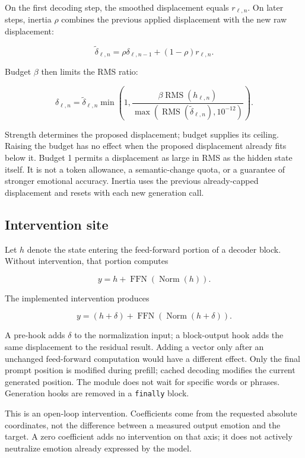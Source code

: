 \documentclass[manuscript,screen,nonacm]{acmart}
\begin{document}
On the first decoding step, the smoothed displacement equals
\(r_{\ell,n}\). On later steps, inertia \(\rho\) combines the previous
applied displacement with the new raw displacement:

\[
\widetilde\delta_{\ell,n}=\rho\delta_{\ell,n-1}+(1-\rho)r_{\ell,n}.
\]

Budget \(\beta\) then limits the RMS ratio:

\[
\delta_{\ell,n}=\widetilde\delta_{\ell,n}
\min\left(1,
\frac{\beta\operatorname{RMS}(h_{\ell,n})}
{\max(\operatorname{RMS}(\widetilde\delta_{\ell,n}),10^{-12})}
\right).
\]

Strength determines the proposed displacement; budget supplies its
ceiling. Raising the budget has no effect when the proposed displacement
already fits below it. Budget 1 permits a displacement as large in RMS
as the hidden state itself. It is not a token allowance, a
semantic-change quota, or a guarantee of stronger emotional accuracy.
Inertia uses the previous already-capped displacement and resets with
each new generation call.

\subsection{Intervention site}\label{intervention-site}

Let \(h\) denote the state entering the feed-forward portion of a
decoder block. Without intervention, that portion computes

\[
y=h+\operatorname{FFN}(\operatorname{Norm}(h)).
\]

The implemented intervention produces

\[
y=(h+\delta)+\operatorname{FFN}(\operatorname{Norm}(h+\delta)).
\]

A pre-hook adds \(\delta\) to the normalization input; a block-output
hook adds the same displacement to the residual result. Adding a vector
only after an unchanged feed-forward computation would have a different
effect. Only the final prompt position is modified during prefill;
cached decoding modifies the current generated position. The module does
not wait for specific words or phrases. Generation hooks are removed in
a \nolinkurl{finally} block.

This is an open-loop intervention. Coefficients come from the requested
absolute coordinates, not the difference between a measured output
emotion and the target. A zero coefficient adds no intervention on that
axis; it does not actively neutralize emotion already expressed by the
model.
\end{document}
